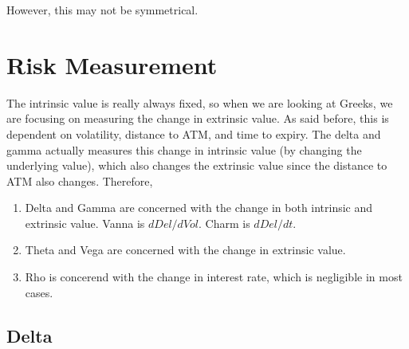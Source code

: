 \documentclass{article}
\begin{document}
    However, this may not be symmetrical. 

    \begin{definition}
      
    \end{definition}

\section{Risk Measurement}

    The intrinsic value is really always fixed, so when we are looking at Greeks, we are focusing on measuring the change in extrinsic value. As said before, this is dependent on volatility, distance to ATM, and time to expiry. The delta and gamma actually measures this change in intrinsic value (by changing the underlying value), which also changes the extrinsic value since the distance to ATM also changes. Therefore,

    \begin{enumerate}
      \item Delta and Gamma are concerned with the change in both intrinsic and extrinsic value. Vanna is $d Del / d Vol$. Charm is $d Del / d t$.
      \item Theta and Vega are concerned with the change in extrinsic value.
      \item Rho is concerend with the change in interest rate, which is negligible in most cases.
    \end{enumerate}

  \subsection{Delta}
\end{document}
